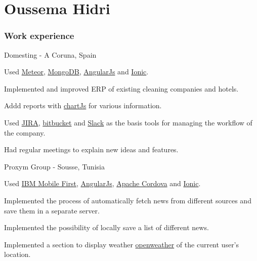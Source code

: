 \documentclass{tccv}
\begin{document}
\part{Oussema Hidri}

\section{Work experience}

\begin{eventlist}

         {Domesting - A Coruna, Spain}

\begin{cvitems}
\item { Used \href{https://www.meteor.com/}{Meteor}, \href{https://www.mongodb.com}{MongoDB}, \href{https://angularjs.org/}{AngularJs} and \href{https://ionicframework.com/}{Ionic}.
}    \item { Implemented and improved ERP of existing cleaning companies and hotels.
}    \item { Addd reports with \href{http://www.chartjs.org/}{chartJs} for various information.
}    \item { Used \href{https://www.atlassian.com/software/jira}{JIRA}, \href{https://bitbucket.org/product}{bitbucket} and \href{https://slack.com}{Slack} as the basis tools for managing the workflow of the company.
     \item {Had regular meetings to explain new ideas and features.}
}\end{cvitems}


     {Proxym Group - Sousse, Tunisia}

    \begin{cvitems}
    \item {Used \href{https://www.ibm.com/mobile/}{IBM Mobile First}, \href{https://angularjs.org/}{AngularJs}, \href{https://cordova.apache.org/}{Apache Cordova} and \href{https://ionicframework.com/}{Ionic}}.
    \item{Implemented the process of automatically fetch news from different sources and save them in a separate server.}
    \item{Implemented the possibility of locally save a list of different news.}
    \item{Implemented a section to display weather \href{https://openweathermap.org}{openweather} of the current user’s location.}
    \end{cvitems}


\end{eventlist}
\end{document}
